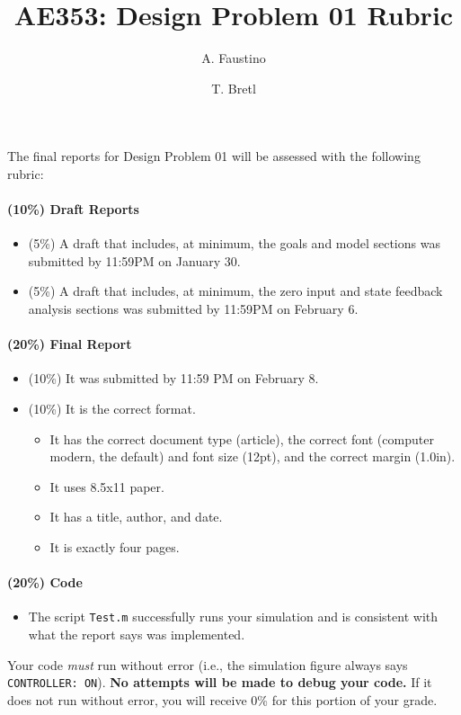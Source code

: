 \documentclass[12pt]{article}
\title{AE353: Design Problem 01 Rubric}
\author{A. Faustino \and T. Bretl}
\begin{document}
\maketitle

\noindent
The final reports for Design Problem 01 will be assessed with the following rubric:

\paragraph{(10\%) Draft Reports}
\begin{itemize}
	\item (5\%) A draft that includes, at minimum, the goals and model sections was submitted by 11:59PM on January 30.
	\item (5\%) A draft that includes, at minimum, the zero input and state feedback analysis sections was submitted by 11:59PM on February 6.
\end{itemize}

\paragraph{(20\%) Final Report}
\begin{itemize}
	\item (10\%) It was submitted by 11:59 PM on February 8.
	\item (10\%) It is the correct format.
	\begin{itemize}
		\item It has the correct document type (article), the correct font (computer modern, the default) and font size (12pt), and the correct margin (1.0in).
		\item It uses 8.5x11 paper.
		\item It has a title, author, and date.
		\item It is exactly four pages.
	\end{itemize}
\end{itemize}

\paragraph{(20\%) Code}
\begin{itemize}
	\item The script \verb|Test.m| successfully runs your simulation and is consistent with what the report says was implemented.
\end{itemize}
Your code \textit{must} run without error (i.e., the simulation figure always says \verb|CONTROLLER: ON|). \textbf{No attempts will be made to debug your code.} If it does not run without error, you will receive 0\% for this portion of your grade.
\end{document}
